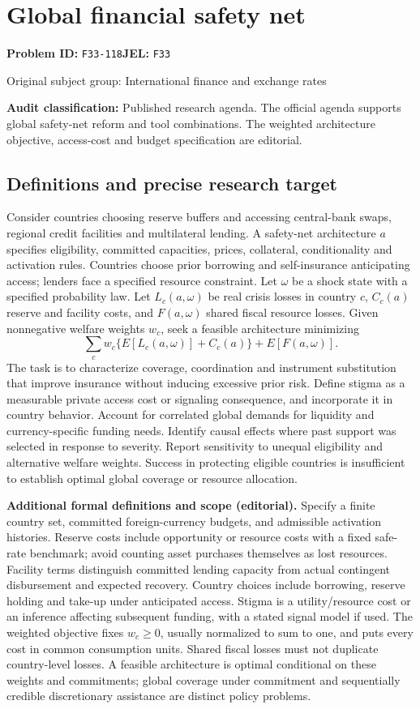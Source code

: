 \documentclass[11pt,a4paper]{article}
\begin{document}
\section*{Global financial safety net}
\textbf{Problem ID:} \texttt{F33-118}\quad \textbf{JEL:} \texttt{F33}\par
\label{problem:OP-0339}
{\sffamily\small\color{muted}Original subject group: International finance and exchange rates\par}
\label{definitions:problem:30007621}
\textbf{Audit classification:} Published research agenda. The official agenda supports global safety-net reform and tool combinations. The weighted architecture objective, access-cost and budget specification are editorial.
\subsection*{Definitions and precise research target}
Consider countries choosing reserve buffers and accessing central-bank swaps, regional credit facilities and multilateral lending. A safety-net architecture \(a\) specifies eligibility, committed capacities, prices, collateral, conditionality and activation rules. Countries choose prior borrowing and self-insurance anticipating access; lenders face a specified resource constraint. Let \(\omega\) be a shock state with a specified probability law. Let \(L_c(a,\omega)\) be real crisis losses in country \(c\), \(C_c(a)\) reserve and facility costs, and \(F(a,\omega)\) shared fiscal resource losses. Given nonnegative welfare weights \(w_c\), seek a feasible architecture minimizing
\[\sum_cw_c\{E[L_c(a,\omega)]+C_c(a)\}+E[F(a,\omega)].\]
The task is to characterize coverage, coordination and instrument substitution that improve insurance without inducing excessive prior risk. Define stigma as a measurable private access cost or signaling consequence, and incorporate it in country behavior. Account for correlated global demands for liquidity and currency-specific funding needs. Identify causal effects where past support was selected in response to severity. Report sensitivity to unequal eligibility and alternative welfare weights. Success in protecting eligible countries is insufficient to establish optimal global coverage or resource allocation.

\textbf{Additional formal definitions and scope (editorial).} Specify a finite country set, committed foreign-currency budgets, and admissible activation histories. Reserve costs include opportunity or resource costs with a fixed safe-rate benchmark; avoid counting asset purchases themselves as lost resources. Facility terms distinguish committed lending capacity from actual contingent disbursement and expected recovery. Country choices include borrowing, reserve holding and take-up under anticipated access. Stigma is a utility/resource cost or an inference affecting subsequent funding, with a stated signal model if used. The weighted objective fixes \(w_c\geq0\), usually normalized to sum to one, and puts every cost in common consumption units. Shared fiscal losses must not duplicate country-level losses. A feasible architecture is optimal conditional on these weights and commitments; global coverage under commitment and sequentially credible discretionary assistance are distinct policy problems.
\end{document}
